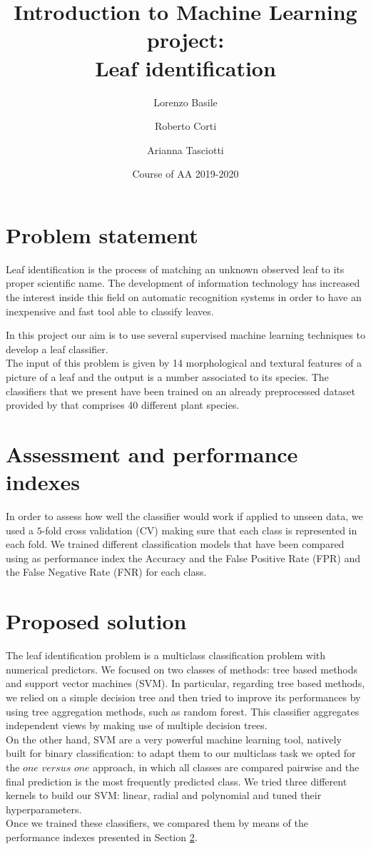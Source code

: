 \documentclass{article}
\title{Introduction to Machine Learning project:\\ Leaf identification}
\author[1]{Lorenzo Basile}
\author[2]{Roberto Corti}
\author[3]{Arianna Tasciotti}
\affil[1,2,3]{
    problem statement,
    solution design,
    solution development,
    writing
}
\date{Course of AA 2019-2020}
\begin{document}
\maketitle



\section{Problem statement}
Leaf identification is the process of matching an unknown observed leaf to its proper scientific name. The development of information technology has increased the interest inside this field on automatic recognition systems in order to have an inexpensive and fast tool able to classify leaves.  

In this project our aim is to use several supervised machine learning techniques to develop a leaf classifier. \\
The input of this problem is given by 14 morphological and textural features of a picture of a leaf and the output is a number associated to its species. The classifiers that we present have been trained on an already preprocessed dataset provided by \cite{silva} that comprises 40 different plant species.

\section{Assessment and performance indexes}\label{2}
In order to assess how well the classifier would work if applied to unseen data, we used a $5$-fold cross validation (CV) making sure that each class is represented in each fold. We trained different classification models that have been compared using as performance index the Accuracy and the False Positive Rate (FPR) and the False Negative Rate (FNR) for each class.

\section{Proposed solution}\label{3}
The leaf identification problem is a multiclass classification problem with numerical predictors. We focused on two classes of methods: tree based methods and support vector machines (SVM).
In particular, regarding tree based methods, we relied on a simple decision tree and then tried to improve its performances by using tree aggregation methods, such as random forest. This classifier aggregates independent views by making use of multiple decision trees. 
\\On the other hand, SVM are a very powerful machine learning tool, natively built for binary classification: to adapt them to our multiclass task we opted for the $\textit{one versus one}$ approach, in which all classes are compared pairwise and the final prediction is the most frequently predicted class. We tried three different kernels to build our SVM: linear, radial and polynomial and tuned their hyperparameters.
\\Once we trained these classifiers, we compared them by means of the performance indexes presented in Section \ref{2}.
\end{document}
